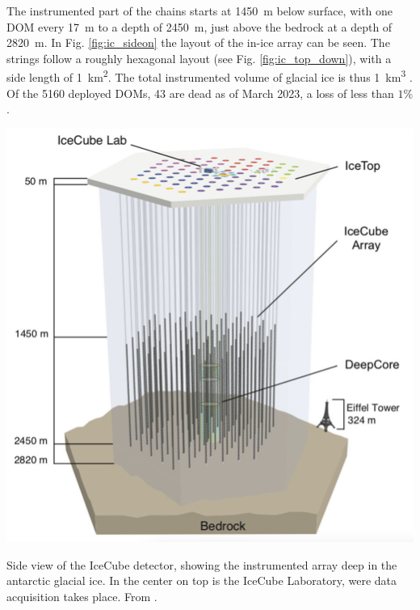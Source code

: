 \documentclass[
    a4paper, %
    fontsize=10pt, %
    twoside=true, %
    numbers=noenddot, %
    fontmethod=tex, %
]{kaobook}
\begin{document}
The instrumented part of the chains starts at \SI{1450}{\m} below surface, with one DOM every \SI{17}{\m} to a depth of \SI{2450}{\m}, just above the bedrock at a depth of \SI{2820}{\m}. In Fig. \ref{fig:ic_sideon} the layout of the in-ice array can be seen. The strings follow a roughly hexagonal layout (see Fig. \ref{fig:ic_top_down}), with a side length of \SI{1}{\km\squared}. The total instrumented volume of glacial ice is thus \SI{1}{\km\cubed} \cite{Aartsen2017}. Of the 5160 deployed DOMs, 43 are dead as of March 2023, a loss of less than $1\%$.
\begin{marginfigure}
    \includegraphics{ic_side_view.png}
    \caption[IceCube side-on]{Side view of the IceCube detector, showing the instrumented array deep in the antarctic glacial ice. In the center on top is the IceCube Laboratory, were data acquisition takes place. From \cite{Ahlers2018a}.}
\end{marginfigure}
\end{document}
